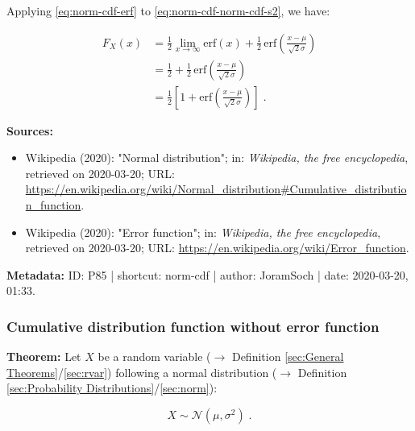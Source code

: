 \documentclass[a4paper,12pt,twoside]{book}
\begin{document}
Applying \eqref{eq:norm-cdf-erf} to \eqref{eq:norm-cdf-norm-cdf-s2}, we have:

\begin{equation} \label{eq:norm-cdf-norm-cdf-s3}
\begin{split}
F_X(x) &= \frac{1}{2} \lim_{x \to \infty} \mathrm{erf}(x) + \frac{1}{2} \, \mathrm{erf}\left( \frac{x-\mu}{\sqrt{2} \sigma} \right) \\
&= \frac{1}{2} + \frac{1}{2} \, \mathrm{erf}\left( \frac{x-\mu}{\sqrt{2} \sigma} \right) \\
&= \frac{1}{2} \left[ 1 + \mathrm{erf}\left( \frac{x-\mu}{\sqrt{2} \sigma} \right) \right] \; .
\end{split}
\end{equation}


\vspace{1em}
\textbf{Sources:}
\begin{itemize}
\item Wikipedia (2020): "Normal distribution"; in: \textit{Wikipedia, the free encyclopedia}, retrieved on 2020-03-20; URL: \url{https://en.wikipedia.org/wiki/Normal_distribution#Cumulative_distribution_function}.
\item Wikipedia (2020): "Error function"; in: \textit{Wikipedia, the free encyclopedia}, retrieved on 2020-03-20; URL: \url{https://en.wikipedia.org/wiki/Error_function}.
\end{itemize}


\vspace{1em}
\textbf{Metadata:} ID: P85 | shortcut: norm-cdf | author: JoramSoch | date: 2020-03-20, 01:33.
\vspace{1em}



\subsubsection[\textbf{Cumulative distribution function without error function}]{Cumulative distribution function without error function} \label{sec:norm-cdfwerf}
\setcounter{equation}{0}

\textbf{Theorem:} Let $X$ be a random variable ($\rightarrow$ Definition \ref{sec:General Theorems}/\ref{sec:rvar}) following a normal distribution ($\rightarrow$ Definition \ref{sec:Probability Distributions}/\ref{sec:norm}):

\begin{equation} \label{eq:norm-cdfwerf-norm}
X \sim \mathcal{N}(\mu, \sigma^2) \; .
\end{equation}
\end{document}
